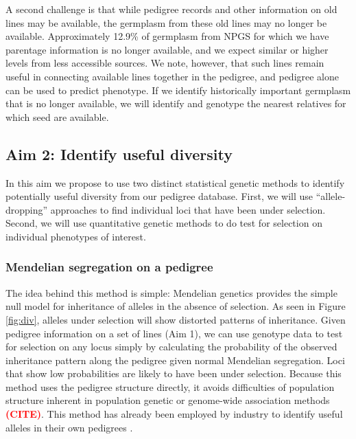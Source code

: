 \documentclass[12pt]{article}
\newcommand{\citex}{\textcolor{red}{\textbf{(CITE)}}}
\begin{document}
A second challenge is that while pedigree records and other information on old lines may be available, the germplasm from these old lines may no longer be available. 
Approximately 12.9\% of germplasm from NPGS for which we have parentage information is no longer available, and we expect similar or higher levels from less accessible sources. 
We note, however, that such lines remain useful in connecting available lines together in the pedigree, and pedigree alone can be used to predict phenotype. 
If we identify historically important germplasm that is no longer available, we will identify and genotype the nearest relatives for which seed are available. 

\subsection*{Aim 2: Identify useful diversity}

In this aim we propose to use two distinct statistical genetic methods to identify potentially useful diversity from our pedigree database.  
First, we will use ``allele-dropping'' approaches to find individual loci that have been under selection.
Second, we will use quantitative genetic methods to do test for selection on individual phenotypes of interest.

\subsubsection*{Mendelian segregation on a pedigree}

The idea behind this method is simple: Mendelian genetics provides the simple null model for inheritance of alleles in the absence of selection.
As seen in Figure \ref{fig:div}, alleles under selection will show distorted patterns of inheritance.
Given pedigree information on a set of lines (Aim 1), we can use genotype data to test for selection on any locus simply by calculating the probability of the observed inheritance pattern along the pedigree given normal Mendelian segregation.
Loci that show low probabilities are likely to have been under selection.
Because this method uses the pedigree structure directly, it avoids difficulties of population structure inherent in population genetic or genome-wide association methods \citex.
This method has already been employed by industry to identify useful alleles in their own pedigrees \citep{sebastian1995method}.
\end{document}
